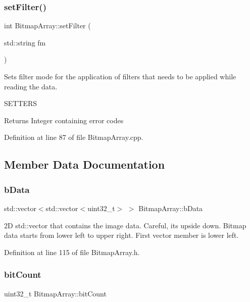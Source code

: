 \subsubsection{\texorpdfstring{setFilter()}{setFilter()}}
{\footnotesize\ttfamily int Bitmap\+Array\+::set\+Filter (\begin{DoxyParamCaption}\item[{std\+::string}]{fm }\end{DoxyParamCaption})}



Sets filter mode for the application of filters that needs to be applied while reading the data. 

S\+E\+T\+T\+E\+RS\begin{DoxyReturn}{Returns}
Integer containing error codes 
\end{DoxyReturn}


Definition at line 87 of file Bitmap\+Array.\+cpp.



\subsection{Member Data Documentation}
\mbox{\label{classBitmapArray_a4af158b9be17ce7ebeab8729c2b34ab2}} 
\subsubsection{\texorpdfstring{bData}{bData}}
{\footnotesize\ttfamily std\+::vector$<$std\+::vector$<$uint32\+\_\+t$>$ $>$ Bitmap\+Array\+::b\+Data\hspace{0.3cm}{\ttfamily [private]}}

2D std\+::vector that contains the image data. Careful, its upside down. Bitmap data starts from lower left to upper right. First vector member is lower left. 

Definition at line 115 of file Bitmap\+Array.\+h.

\mbox{\label{classBitmapArray_a18127e27d4b1477fd46ef0c0b3dbc110}} 
\subsubsection{\texorpdfstring{bitCount}{bitCount}}
{\footnotesize\ttfamily uint32\+\_\+t Bitmap\+Array\+::bit\+Count\hspace{0.3cm}{\ttfamily [private]}}

